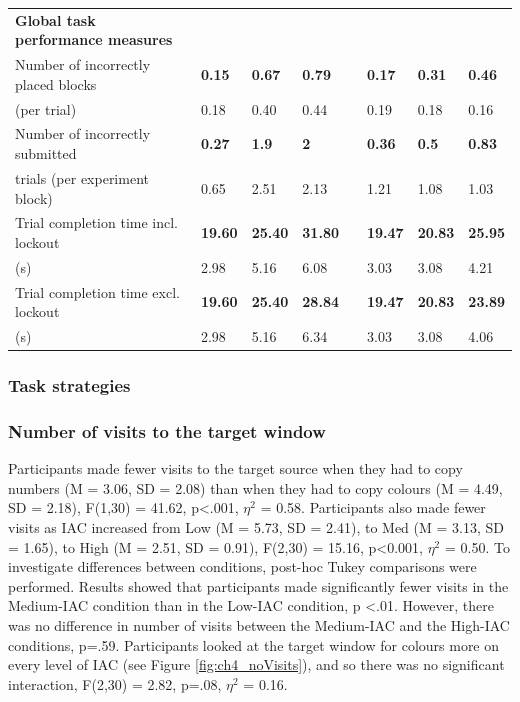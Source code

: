 \begin{tabular}{@{}p{6cm}lllclll@{}}
\textbf{Global task performance measures}\\
Number of incorrectly placed blocks 
				  		    & \textbf{0.15} & \textbf{0.67} & \textbf{0.79} && \textbf{0.17} & \textbf{0.31} & \textbf{0.46} \\
(per trial) 				       	    &              0.18   & 		  0.40  & 	         0.44  && 		 0.19  & 	         0.18 & 	      0.16 \\
Number of incorrectly submitted
				  		    & \textbf{0.27} & \textbf{1.9} & \textbf{2} && \textbf{0.36} & \textbf{0.5} & \textbf{0.83} \\
trials (per experiment block)	    &              0.65   & 		2.51 & 	   2.13  && 		 1.21  & 	         1.08 & 	      1.03 \\
Trial completion time incl. lockout
				  		    & \textbf{19.60} & \textbf{25.40} & \textbf{31.80} && \textbf{19.47} & \textbf{20.83} & \textbf{25.95} \\
(s)						    &                2.98   & 		5.16 & 	   	     6.08  && 	         3.03  & 	        3.08   & 	         4.21 \\
Trial completion time excl. lockout
				  		    & \textbf{19.60} & \textbf{25.40} & \textbf{28.84} && \textbf{19.47} & \textbf{20.83} & \textbf{23.89} \\
(s)						    &              2.98   & 		5.16 & 	   6.34  && 		 3.03  & 	         3.08 & 	      4.06 \\

\bottomrule
\end{tabular}
\label{table:ch4_IACmeans}

\subsubsection{Task strategies}

\subsubsection{Number of visits to the target window}
Participants made fewer visits to the target source when they had to copy numbers (M = 3.06, SD = 2.08) than when they had to copy colours (M = 4.49, SD = 2.18), F(1,30) = 41.62, p<.001, $\eta^2$  = 0.58. Participants also made fewer visits as IAC increased from Low (M = 5.73, SD = 2.41), to Med (M = 3.13, SD = 1.65), to High (M = 2.51, SD = 0.91), F(2,30) = 15.16, p<0.001, $\eta^2$  = 0.50. To investigate differences between conditions, post-hoc Tukey comparisons were performed. Results showed that participants made significantly fewer visits in the Medium-IAC condition than in the Low-IAC condition, p <.01. However, there was no difference in number of visits between the Medium-IAC and the High-IAC conditions, p=.59. Participants looked at the target window for colours more on every level of IAC (see Figure \ref{fig:ch4_noVisits}), and so there was no significant interaction, F(2,30) = 2.82, p=.08, $\eta^2$  = 0.16. 

